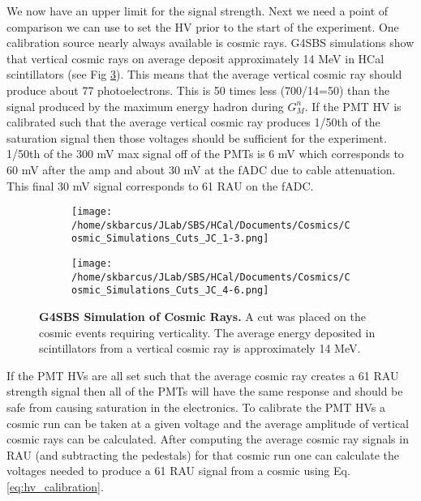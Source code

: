 \documentclass[10pt]{article}
\begin{document}
We now have an upper limit for the signal strength. Next we need a point of comparison we can use to set the HV prior to the start of the experiment. One calibration source nearly always available is cosmic rays. G4SBS simulations show that vertical cosmic rays on average deposit approximately 14 MeV in HCal scintillators (see Fig \ref{fig:vertical_cosmics}). This means that the average vertical cosmic ray should produce about 77 photoelectrons. This is 50 times less (700/14=50) than the signal produced by the maximum energy hadron during $G_M^n$. If the PMT HV is calibrated such that the average vertical cosmic ray produces 1/50th of the saturation signal then those voltages should be sufficient for the experiment. 1/50th of the 300 mV max signal off of the PMTs is 6 mV which corresponds to 60 mV after the amp and about 30 mV at the fADC due to cable attenuation. This final 30 mV signal corresponds to 61 RAU on the fADC.

	\begin{figure}[!ht]
		\begin{subfigure}{.5\textwidth}
  		\centering
  			\texttt{[image: /home/skbarcus/JLab/SBS/HCal/Documents/Cosmics/Cosmic\_Simulations\_Cuts\_JC\_1-3.png]}
  			\label{fig:vertical_cosmics_1-3}
		\end{subfigure}
		\begin{subfigure}{.5\textwidth}
  		\centering
  			\texttt{[image: /home/skbarcus/JLab/SBS/HCal/Documents/Cosmics/Cosmic\_Simulations\_Cuts\_JC\_4-6.png]}
  			\label{fig:vertical_cosmics_4-6}
		\end{subfigure}
		\caption{
{\bf{G4SBS Simulation of Cosmic Rays.}} A cut was placed on the cosmic events requiring verticality. The average energy deposited in scintillators from a vertical cosmic ray is approximately 14 MeV.}
		\label{fig:vertical_cosmics}
	\end{figure}

If the PMT HVs are all set such that the average cosmic ray creates a 61 RAU strength signal then all of the PMTs will have the same response and should be safe from causing saturation in the electronics. To calibrate the PMT HVs a cosmic run can be taken at a given voltage and the average amplitude of vertical cosmic rays can be calculated. After computing the average cosmic ray signals in RAU (and subtracting the pedestals) for that cosmic run one can calculate the voltages needed to produce a 61 RAU signal from a cosmic using Eq. \ref{eq:hv_calibration}.
\end{document}
